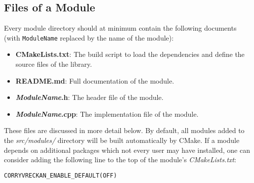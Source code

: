 \subsection{Files of a Module}
\label{sec:module_files}
Every module directory should at minimum contain the following documents (with \texttt{ModuleName} replaced by the name of the module):
\begin{itemize}
\item \textbf{CMakeLists.txt}: The build script to load the dependencies and define the source files of the library.
\item \textbf{README.md}: Full documentation of the module.
\item \textbf{\textit{ModuleName}.h}: The header file of the module.
\item \textbf{\textit{ModuleName}.cpp}: The implementation file of the module.
\end{itemize}
These files are discussed in more detail below.
By default, all modules added to the \textit{src/modules/} directory will be built automatically by CMake.
If a module depends on additional packages which not every user may have installed, one can consider adding the following line to the top of the module's \textit{CMakeLists.txt}:
\begin{verbatim}
CORRYVRECKAN_ENABLE_DEFAULT(OFF)
\end{verbatim}

